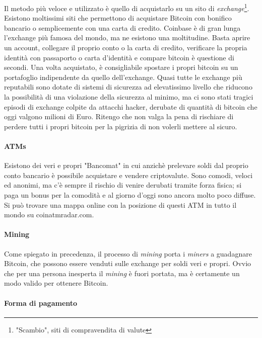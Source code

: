 \documentclass {article}
\begin{document}
Il metodo più veloce e utilizzato è quello di acquistarlo su un sito di \textit{exchange}\footnote{"Scambio", siti di compravendita di valute}. Esistono moltissimi siti che permettono di acquistare Bitcoin con bonifico bancario o semplicemente con una carta di credito.
Coinbase è di gran lunga l'exchange più famosa del mondo, ma ne esistono una moltitudine.
Basta aprire un account, collegare il proprio conto o la carta di credito, verificare la propria identità con passaporto o carta d'identità e compare bitcoin è questione di secondi.
Una volta acquistato, è consigliabile spostare i propri bitcoin su un portafoglio indipendente da quello dell'exchange.
Quasi tutte le exchange più reputabili sono dotate di sistemi di sicurezza ad elevatissimo livello che riducono la possibilità di una violazione della sicurezza al minimo, ma ci sono stati tragici episodi di exchange colpite da attacchi hacker, derubate di quantità di bitcoin che oggi valgono milioni di Euro.
Ritengo che non valga la pena di rischiare di perdere tutti i propri bitcoin per la pigrizia di non volerli mettere al sicuro.

\paragraph {ATMs}

Esistono dei veri e propri "Bancomat" in cui anzichè prelevare soldi dal proprio conto bancario è possibile acquistare e vendere criptovalute.
Sono comodi, veloci ed anonimi, ma c'è sempre il rischio di venire derubati tramite forza fisica; si paga un bonus per la comodità e al giorno d'oggi sono ancora molto poco diffuse.
Si può trovare una mappa online con la posizione di questi ATM in tutto il mondo su coinatmradar.com.

\paragraph {Mining}

Come spiegato in precedenza, il processo di \textit{mining} porta i \textit{miners} a guadagnare Bitcoin, che possono essere venduti sulle exchange per soldi veri e propri.
Ovvio che per una persona inesperta il \textit{mining} è fuori portata, ma è certamente un modo valido per ottenere Bitcoin.

\paragraph {Forma di pagamento}
\end{document}
